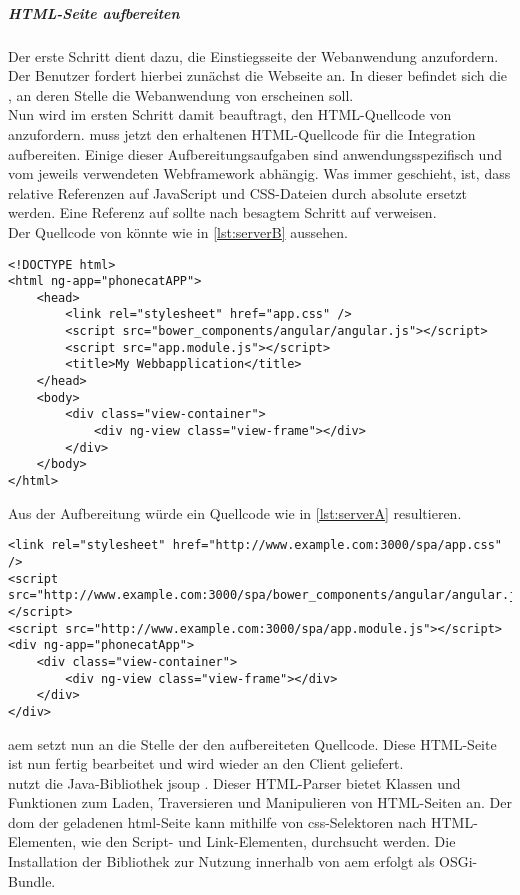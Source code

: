 \subparagraph{HTML-Seite aufbereiten}
\label{sec:html-seite-aufbereiten}
Der erste Schritt dient dazu, die Einstiegsseite der Webanwendung anzufordern. \\
Der Benutzer fordert hierbei zunächst die Webseite \serverA an. In dieser befindet sich die \ajc, an deren Stelle die Webanwendung von \serverB erscheinen soll.\\
Nun wird im ersten Schritt  damit beauftragt, den HTML-Quellcode von \serverB anzufordern.  muss jetzt den erhaltenen HTML-Quellcode für die Integration aufbereiten. Einige dieser Aufbereitungsaufgaben sind anwendungsspezifisch und vom jeweils verwendeten Webframework abhängig.
Was immer geschieht, ist, dass relative Referenzen auf JavaScript und CSS-Dateien durch absolute ersetzt werden. Eine Referenz auf  sollte nach besagtem Schritt auf  verweisen.\\
Der Quellcode von  könnte wie in \autoref{lst:serverB} aussehen.

\begin{lstlisting}[style=htmlcssjs, caption=Ausgangssituation auf Server B, label=lst:serverB]
<!DOCTYPE html>
<html ng-app="phonecatAPP">
	<head>
		<link rel="stylesheet" href="app.css" />
		<script src="bower_components/angular/angular.js"></script>
		<script src="app.module.js"></script>
		<title>My Webbapplication</title>
	</head>
	<body>
		<div class="view-container">
			<div ng-view class="view-frame"></div>
		</div>
	</body>
</html>
\end{lstlisting}

Aus der Aufbereitung würde ein Quellcode wie in \autoref{lst:serverA} resultieren.

\begin{lstlisting}[style=htmlcssjs, caption=Aufbereiteter Quellcode, label=lst:serverA]
<link rel="stylesheet" href="http://www.example.com:3000/spa/app.css" />
<script src="http://www.example.com:3000/spa/bower_components/angular/angular.js"></script>
<script src="http://www.example.com:3000/spa/app.module.js"></script>
<div ng-app="phonecatApp">
	<div class="view-container">
		<div ng-view class="view-frame"></div>
	</div>
</div>

\end{lstlisting}

\ac{aem} setzt nun an die Stelle der \ajc den aufbereiteten Quellcode. Diese HTML-Seite ist nun fertig bearbeitet und wird wieder an den Client geliefert. \\
 nutzt die Java-Bibliothek jsoup \cite{Hedley2016}. Dieser HTML-Parser bietet Klassen und Funktionen zum Laden, Traversieren und Manipulieren von HTML-Seiten an. Der \ac{dom} der geladenen \ac{html}-Seite kann mithilfe von \ac{css}-Selektoren nach HTML-Elementen, wie den Script- und Link-Elementen, durchsucht werden. Die Installation der Bibliothek zur Nutzung innerhalb von \ac{aem} erfolgt als OSGi-Bundle.